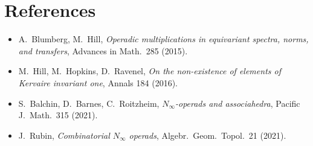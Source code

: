 \section*{References}
\begin{itemize}\setlength\itemsep{0.2em}
\item A.~Blumberg, M.~Hill, \emph{Operadic multiplications in equivariant spectra, norms, and transfers}, Advances in Math.\ 285 (2015).
\item M.~Hill, M.~Hopkins, D.~Ravenel, \emph{On the non-existence of elements of Kervaire invariant one}, Annals 184 (2016).
\item S.~Balchin, D.~Barnes, C.~Roitzheim, \emph{$N_\infty$-operads and associahedra}, Pacific J.\ Math.\ 315 (2021).
\item J.~Rubin, \emph{Combinatorial $N_\infty$ operads}, Algebr.\ Geom.\ Topol.\ 21 (2021).
\end{itemize}


